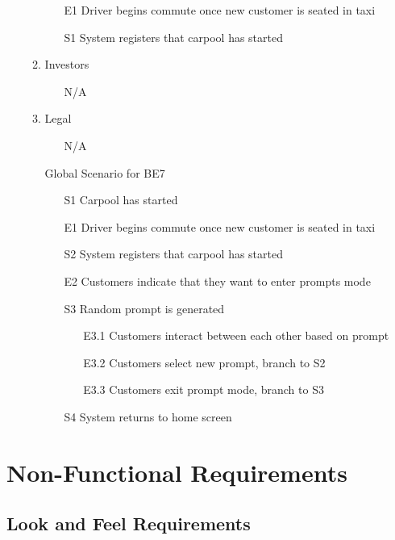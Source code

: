 \documentclass[]{article}
\begin{document}
\begin{enumerate}[{BE}1.]
\begin{enumerate}[{VP7}.1]
\begin{enumerate}
				\item[E1] Driver begins commute once new customer is seated in taxi
				\item[S1] System registers that carpool has started
			\end{enumerate}
		\item Investors
			\begin{enumerate}
				\item[N/A]
			\end{enumerate}
		\item Legal
			\begin{enumerate}
				\item[N/A]
			\end{enumerate}
		\item[Global] Scenario for BE7
			\begin{enumerate}
				\item[S1] Carpool has started
				\item[E1] Driver begins commute once new customer is seated in taxi
				\item[S2] System registers that carpool has started
				\item[E2] Customers indicate that they want to enter prompts mode
				\item[S3] Random prompt is generated
				\begin{enumerate}
					\item[E3.1] Customers interact between each other based on prompt
					\item[E3.2] Customers select new prompt, branch to S2
					\item[E3.3] Customers exit prompt mode, branch to S3
				\end{enumerate}
				\item[S4] System returns to home screen
			\end{enumerate}
	\end{enumerate}
\end{enumerate}



\section{Non-Functional Requirements}
\label{sec:non-functional_requirements}
\subsection{Look and Feel Requirements}
\label{sub:look_and_feel_requirements}
\end{document}
